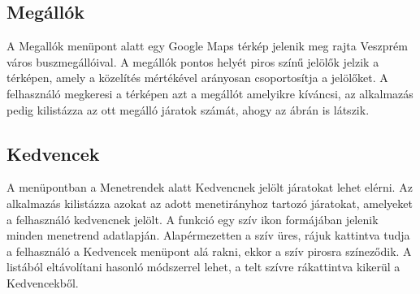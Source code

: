 \subsection {Megállók}
\label {megallok}
A Megallók menüpont alatt egy Google Maps térkép jelenik meg rajta Veszprém város buszmegállóival.
A megállók pontos helyét piros színű jelölők jelzik a térképen, amely a közelítés mértékével arányosan csoportosítja a jelölőket.
A felhasználó megkeresi a térképen azt a megállót amelyikre kíváncsi, az alkalmazás pedig kilistázza az ott megálló járatok számát, ahogy az  ábrán is látszik.

\subsection {Kedvencek}
\label {kedvencek}
A menüpontban a Menetrendek alatt Kedvencnek jelölt járatokat lehet elérni.
Az alkalmazás kilistázza azokat az adott menetirányhoz tartozó járatokat, amelyeket a felhasználó kedvencnek jelölt.
A funkció egy szív ikon formájában jelenik minden menetrend adatlapján.
Alapérmezetten a szív üres, rájuk kattintva tudja a felhasználó a Kedvencek menüpont alá rakni, ekkor a szív pirosra színeződik.
A listából eltávolítani hasonló módszerrel lehet, a telt szívre rákattintva kikerül a Kedvencekből.

